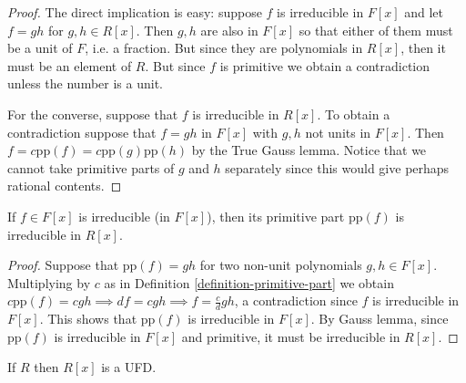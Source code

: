\begin{proof}
The direct implication is easy: suppose $f$ is irreducible in $F[x]$ and let
$f=gh$ for $g,h\in R[x]$. Then $g,h$ are also in $F[x]$ so that either of them
must be a unit of $F$, i.e. a fraction. But since they are polynomials in
$R[x]$, then it must be an element of $R$. But since $f$ is primitive we obtain
a contradiction unless the number is a unit.

For the converse, suppose that $f$ is irreducible in $R[x]$. To obtain a 
contradiction suppose that $f=gh$ in $F[x]$ with $g,h$ not units in $F[x]$.
Then $f=c\text{pp}(f)=c\text{pp}(g)\text{pp}(h)$ by the True Gauss lemma. 
Notice that we cannot take primitive parts of $g$ and $h$ separately since this
would give perhaps rational contents.
\end{proof}

\begin{lemma}
\label{lemma-irreducible-in-Fx-implies-primitive-part-irreducible}
If $f\in F[x]$ is irreducible (in $F[x]$), then its primitive part
$\text{pp}(f)$ is irreducible in $R[x]$.
\end{lemma}

\begin{proof}
Suppose that $\text{pp}(f)=gh$ for two non-unit polynomials $g,h\in F[x]$.
Multiplying by $c$ as in Definition \ref{definition-primitive-part} we obtain
$c\text{pp}(f)=cgh \implies df=cgh \implies f=\frac{c}{d}gh$, a contradiction
since $f$ is irreducible in $F[x]$. This shows that
$\text{pp}(f)$ is irreducible in $F[x]$. By Gauss lemma, since $\text{pp}(f)$ is
irreducible in $F[x]$ and primitive, it must be irreducible in $R[x]$.
\end{proof}

\begin{lemma}
\label{lemma-Gauss-lemma-corollary}
If $R$ then $R[x]$ is a UFD.
\end{lemma}

